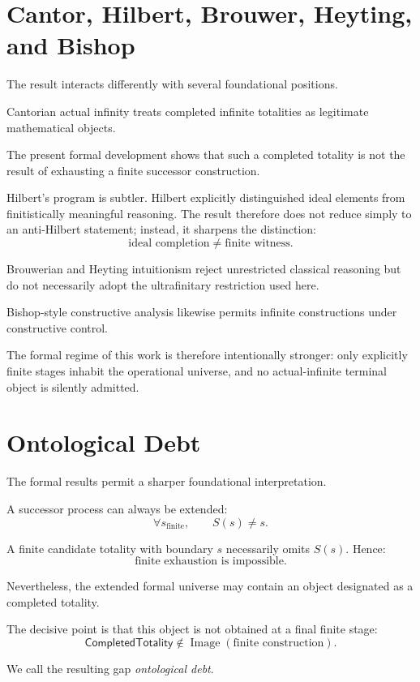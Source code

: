 \documentclass[11pt,a4paper]{article}
\newcommand{\CompletedTotality}{\mathsf{CompletedTotality}}
\begin{document}
\section{Cantor, Hilbert, Brouwer, Heyting, and Bishop}

The result interacts differently with several foundational positions.

Cantorian actual infinity treats completed infinite totalities as
legitimate mathematical objects.

The present formal development shows that such a completed totality is
not the result of exhausting a finite successor construction.

Hilbert's program is subtler. Hilbert explicitly distinguished ideal
elements from finitistically meaningful reasoning. The result therefore
does not reduce simply to an anti-Hilbert statement; instead, it
sharpens the distinction:
\[
\boxed{
\text{ideal completion}\neq\text{finite witness}.
}
\]

Brouwerian and Heyting intuitionism reject unrestricted classical
reasoning but do not necessarily adopt the ultrafinitary restriction
used here.

Bishop-style constructive analysis likewise permits infinite
constructions under constructive control.

The formal regime of this work is therefore intentionally stronger:
only explicitly finite stages inhabit the operational universe, and no
actual-infinite terminal object is silently admitted.


\section{Ontological Debt}

The formal results permit a sharper foundational interpretation.

A successor process can always be extended:
\[
\forall s_{\mathrm{finite}},
\qquad
S(s)\neq s.
\]

A finite candidate totality with boundary \(s\) necessarily omits
\(S(s)\). Hence:
\[
\boxed{
\text{finite exhaustion is impossible}.
}
\]

Nevertheless, the extended formal universe may contain an object
designated as a completed totality.

The decisive point is that this object is not obtained at a final
finite stage:
\[
\boxed{
\CompletedTotality
\notin
\operatorname{Image}(\text{finite construction}).
}
\]

We call the resulting gap \emph{ontological debt}.
\end{document}

